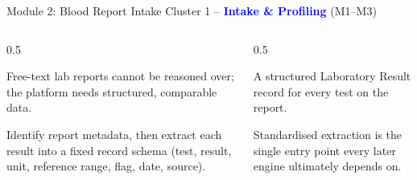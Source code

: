 \documentclass[9pt,aspectratio=169]{beamer}
\begin{document}
\begin{frame}{Module 2: Blood Report Intake}
\textcolor{black!55}{\scriptsize Cluster 1 -- \textcolor{blue}{\textbf{Intake \& Profiling}} (M1--M3)}\\[2pt]
\begin{columns}[T,onlytextwidth]
\begin{column}{0.5\textwidth}
\begin{tcolorbox}[colback=blue!7,colframe=blue!55!black,title=\textbf{Motivation},boxrule=0.6pt,arc=1mm,left=5pt,right=5pt,top=3pt,bottom=3pt,fonttitle=\small]
\footnotesize Free-text lab reports cannot be reasoned over; the platform needs structured, comparable data.
\end{tcolorbox}
\vspace{5pt}
\begin{tcolorbox}[colback=teal!7,colframe=teal!55!black,title=\textbf{Method},boxrule=0.6pt,arc=1mm,left=5pt,right=5pt,top=3pt,bottom=3pt,fonttitle=\small]
\footnotesize Identify report metadata, then extract each result into a fixed record schema (test, result, unit, reference range, flag, date, source).
\end{tcolorbox}
\end{column}
\begin{column}{0.5\textwidth}
\begin{tcolorbox}[colback=green!8,colframe=green!45!black,title=\textbf{Result},boxrule=0.6pt,arc=1mm,left=5pt,right=5pt,top=3pt,bottom=3pt,fonttitle=\small]
\footnotesize A structured Laboratory Result record for every test on the report.
\end{tcolorbox}
\vspace{5pt}
\begin{tcolorbox}[colback=orange!10,colframe=orange!65!black,title=\textbf{Conclusion},boxrule=0.6pt,arc=1mm,left=5pt,right=5pt,top=3pt,bottom=3pt,fonttitle=\small]
\footnotesize Standardised extraction is the single entry point every later engine ultimately depends on.
\end{tcolorbox}
\end{column}
\end{columns}
\end{frame}
\end{document}
